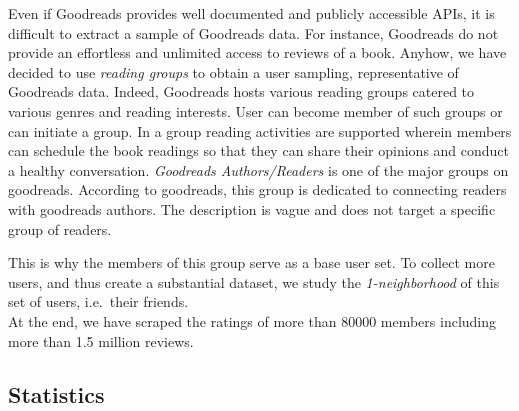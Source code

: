 \documentclass[11pt]{article}
\begin{document}

Even if Goodreads provides well documented and publicly accessible APIs, it is difficult to extract a sample of Goodreads data. For instance, Goodreads do not provide an effortless and unlimited access to reviews of a book.
Anyhow, we have decided to use \emph{reading groups} to obtain a user sampling, representative of Goodreads data.
Indeed, Goodreads hosts various reading groups catered to various genres and reading interests. User can become member of such groups or can initiate a group. In a group reading activities are supported wherein members can schedule the book readings so that they can share their opinions and conduct a healthy conversation. {\it Goodreads Authors/Readers} is one of the major groups on goodreads.  According to goodreads, this group is dedicated to connecting readers with goodreads authors. The description is vague and does not target a specific group of readers.

This is why the members of this group serve as a base user set.
To collect more users, and thus create a substantial dataset, we study the {\it 1-neighborhood} of this set of users, i.e.\ their friends.\\
At the end, we have scraped the ratings of more than 80000 members including more than 1.5 million reviews.

\subsection{Statistics}
\end{document}
